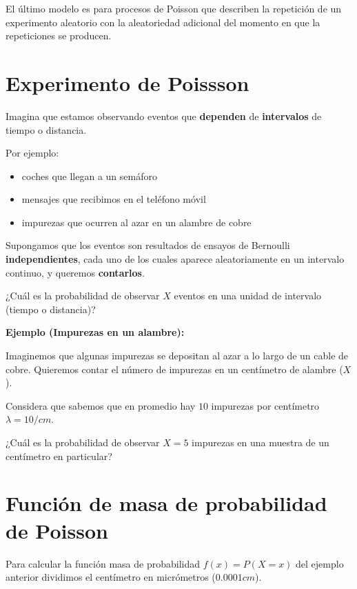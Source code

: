 \documentclass[
]{book}
\providecommand{\tightlist}{%
  \setlength{\itemsep}{0pt}\setlength{\parskip}{0pt}}
\begin{document}
El último modelo es para procesos de Poisson que describen la repetición de un experimento aleatorio con la aleatoriedad adicional del momento en que la repeticiones se producen.

\hypertarget{experimento-de-poissson}{%
\section{Experimento de Poissson}\label{experimento-de-poissson}}

Imagina que estamos observando eventos que \textbf{dependen} de \textbf{intervalos} de tiempo o distancia.

Por ejemplo:

\begin{itemize}
\tightlist
\item
  coches que llegan a un semáforo
\item
  mensajes que recibimos en el teléfono móvil
\item
  impurezas que ocurren al azar en un alambre de cobre
\end{itemize}

Supongamos que los eventos son resultados de ensayos de Bernoulli \textbf{independientes}, cada uno de los cuales aparece aleatoriamente en un intervalo continuo, y queremos \textbf{contarlos}.

¿Cuál es la probabilidad de observar \(X\) eventos en una unidad de intervalo (tiempo o distancia)?

\textbf{Ejemplo (Impurezas en un alambre):}

Imaginemos que algunas impurezas se depositan al azar a lo largo de un cable de cobre. Quieremos contar el número de impurezas en un centímetro de alambre (\(X\)).

Considera que sabemos que en promedio hay \(10\) impurezas por centímetro \(\lambda=10/cm\).

¿Cuál es la probabilidad de observar \(X=5\) impurezas en una muestra de un centímetro en particular?

\hypertarget{funciuxf3n-de-masa-de-probabilidad-de-poisson}{%
\section{Función de masa de probabilidad de Poisson}\label{funciuxf3n-de-masa-de-probabilidad-de-poisson}}

Para calcular la función masa de probabilidad \(f(x)=P(X=x)\) del ejemplo anterior dividimos el centímetro en micrómetros (\(0.0001cm\)).
\end{document}
